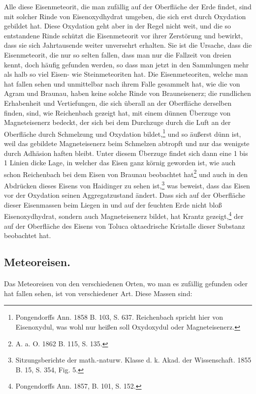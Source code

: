 \documentclass[a4paper, 11pt, oneside]{article}
\begin{document}
Alle diese Eisenmeteorit, die man zufällig auf der Oberfläche der Erde findet, sind mit solcher Rinde von Eisenoxydhydrat umgeben, die sich erst durch Oxydation gebildet hat. Diese Oxydation geht aber in der Regel nicht weit, und die so entstandene Rinde schützt die Eisenmeteorit vor ihrer Zerstörung und bewirkt, dass sie sich Jahrtausende weiter unversehrt erhalten. Sie ist die Ursache, dass die Eisenmeteorit, die nur so selten fallen, dass man nur die Fallzeit von dreien kennt, doch häufig gefunden werden, so dass man jetzt in den Sammlungen mehr als halb so viel Eisen- wie Steinmeteoriten hat. Die Eisenmeteoriten, welche man hat fallen sehen und unmittelbar nach ihrem Falle gesammelt hat, wie die von Agram und Braunau, haben keine solche Rinde von Brauneisenerz; die rundlichen Erhabenheit und Vertiefungen, die sich überall an der Oberfläche derselben finden, sind, wie Reichenbach gezeigt hat, mit einem dünnen Überzuge von Magneteisenerz bedeckt, der sich bei dem Durchzuge durch die Luft an der Oberfläche durch Schmelzung und Oxydation bildet,\footnote{Pongendorffs Ann. 1858 B. 103, S. 637. Reichenbach spricht hier von Eisenoxydul, was wohl nur heißen soll Oxydoxydul oder Magneteisenerz.} und so äußerst dünn ist, weil das gebildete Magneteisenerz beim Schmelzen abtropft und nur das wenigste durch Adhäsion haften bleibt. Unter diesem Überzuge findet sich dann eine 1 bis 1 Linien dicke Lage, in welcher das Eisen ganz körnig geworden ist, wie auch schon Reichenbach bei dem Eisen von Braunau beobachtet hat\footnote{A. a. O. 1862 B. 115, S. 135.} und auch in den Abdrücken dieses Eisens von Haidinger zu sehen ist,\footnote{Sitzungsberichte der math.-naturw. Klasse d. k. Akad. der Wissenschaft. 1855 B. 15, S. 354, Fig. 5.} was beweist, dass das Eisen vor der Oxydation seinen Aggregatzustand ändert. Dass sich auf der Oberfläche dieser Eisenmassen beim Liegen in und auf der feuchten Erde nicht bloß Eisenoxydhydrat, sondern auch Magneteisenerz bildet, hat Krantz gezeigt,\footnote{Pongendorffs Ann. 1857, B. 101, S. 152.} der auf der Oberfläche des Eisens von Toluca oktaedrische Kristalle dieser Substanz beobachtet hat.
\subsection{Meteoreisen.}
\paragraph{}
Das Meteoreisen von den verschiedenen Orten, wo man es zufällig gefunden oder hat fallen sehen, ist von verschiedener Art. Diese Massen sind:
\end{document}
